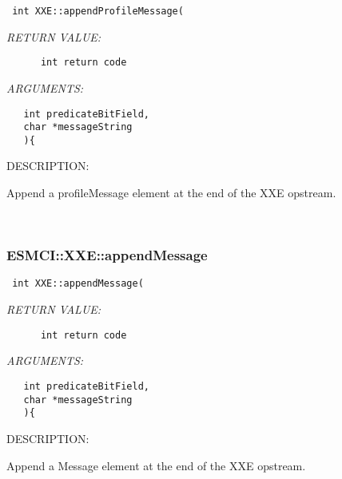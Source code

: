   
\begin{verbatim} int XXE::appendProfileMessage(\end{verbatim}{\em RETURN VALUE:}
\begin{verbatim}      int return code\end{verbatim}{\em ARGUMENTS:}
\begin{verbatim}   int predicateBitField,
   char *messageString
   ){\end{verbatim}
{\sf DESCRIPTION:\\ }


    Append a profileMessage element at the end of the XXE opstream. 
 
\mbox{}\hrulefill\
 
\subsubsection [ESMCI::XXE::appendMessage] {ESMCI::XXE::appendMessage}


  
\begin{verbatim} int XXE::appendMessage(\end{verbatim}{\em RETURN VALUE:}
\begin{verbatim}      int return code\end{verbatim}{\em ARGUMENTS:}
\begin{verbatim}   int predicateBitField,
   char *messageString
   ){\end{verbatim}
{\sf DESCRIPTION:\\ }


    Append a Message element at the end of the XXE opstream.
\setlength{\parskip}{\oldparskip}
\setlength{\parindent}{\oldparindent}
\setlength{\baselineskip}{\oldbaselineskip}

